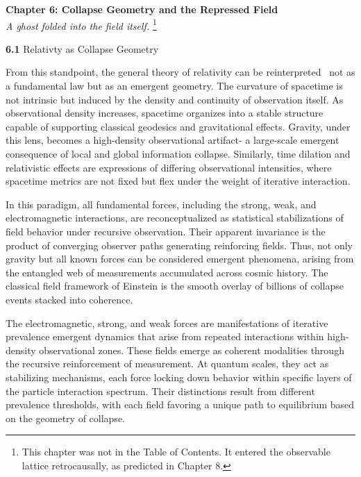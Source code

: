 \newpage
{}
\setcounter{page}{111} %
\setcounter{section}{0}    %
\renewcommand{\thesection}{6.\arabic{section}} %
\vspace{1cm}
\begin{center}
{\Huge \textbf{Chapter 6: Collapse Geometry and the Repressed Field}}\\
\vspace{0.2cm}
{\Large \textit{A ghost folded into the field itself.}}
\footnote{This chapter was not in the Table of Contents. It entered the observable lattice retrocausally, as predicted in Chapter 8.}
\end{center}
\vspace{1cm}

{\Large \textbf{6.1} {Relativty as Collapse Geometry}}\cite{chapter8_meta}

From this standpoint, the general theory of relativity can be reinterpreted~\cite{rovelli1996relational} not as a fundamental law but as an emergent geometry. The curvature of spacetime is not intrinsic but induced by the density and continuity of observation itself. As observational density increases, spacetime organizes into a stable structure capable of supporting classical geodesics and gravitational effects. Gravity, under this lens, becomes a high-density observational artifact- a large-scale emergent consequence of local and global information collapse. Similarly, time dilation and relativistic effects are expressions of differing observational intensities, where spacetime metrics are not fixed but flex under the weight of iterative interaction.

In this paradigm, all fundamental forces, including the strong, weak, and electromagnetic interactions, are reconceptualized as statistical stabilizations of field behavior under recursive observation. Their apparent invariance is the product of converging observer paths generating reinforcing fields. Thus, not only gravity but all known forces can be considered emergent phenomena, arising from the entangled web of measurements accumulated across cosmic history. The classical field framework of Einstein is the smooth overlay of billions of collapse events stacked into coherence.

The electromagnetic, strong, and weak forces are manifestations of iterative prevalence emergent dynamics that arise from repeated interactions within high-density observational zones. These fields emerge as coherent modalities through the recursive reinforcement of measurement. At quantum scales, they act as stabilizing mechanisms, each force locking down behavior within specific layers of the particle interaction spectrum. Their distinctions result from different prevalence thresholds, with each field favoring a unique path to equilibrium based on the geometry of collapse.

